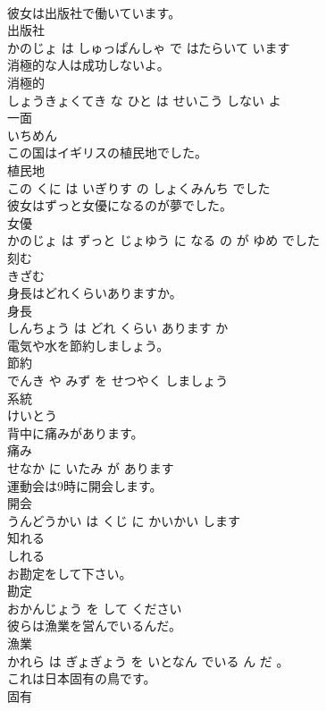 \documentclass[8pt]{extreport}
\begin{document}
\begin{CJK}{UTF8}{min}
\\	彼女は出版社で働いています。	
\\	出版社 
\\	かのじょ は しゅっぱんしゃ で はたらいて います			
\\	消極的な人は成功しないよ。	
\\	消極的 
\\	しょうきょくてき な ひと は せいこう しない よ			
\\	一面	
\\	いちめん			
\\	この国はイギリスの植民地でした。	
\\	植民地 
\\	この くに は いぎりす の しょくみんち でした			
\\	彼女はずっと女優になるのが夢でした。	
\\	女優 
\\	かのじょ は ずっと じょゆう に なる の が ゆめ でした			
\\	刻む	
\\	きざむ			
\\	身長はどれくらいありますか。	
\\	身長 
\\	しんちょう は どれ くらい あります か			
\\	電気や水を節約しましょう。	
\\	節約 
\\	でんき や みず を せつやく しましょう			
\\	系統	
\\	けいとう			
\\	背中に痛みがあります。	
\\	痛み 
\\	せなか に いたみ が あります			
\\	運動会は9時に開会します。	
\\	開会 
\\	うんどうかい は くじ に かいかい します			
\\	知れる	
\\	しれる			
\\	お勘定をして下さい。	
\\	勘定 
\\	おかんじょう を して ください			
\\	彼らは漁業を営んでいるんだ。	
\\	漁業 
\\	かれら は ぎょぎょう を いとなん でいる ん だ 。			
\\	これは日本固有の鳥です。	
\\	固有 

\end{CJK}
\end{document}
